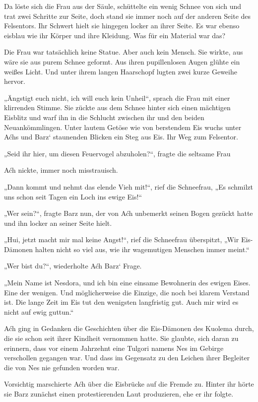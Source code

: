 Da löste sich die Frau aus der Säule, schüttelte ein wenig Schnee von sich und trat zwei Schritte zur Seite, doch stand sie immer noch auf der anderen Seite des Felsentors. Ihr Schwert hielt sie hingegen locker an ihrer Seite. Es war ebenso eisblau wie ihr Körper und ihre Kleidung. Was für ein Material war das?

Die Frau war tatsächlich keine Statue. Aber auch kein Mensch. Sie wirkte, aus wäre sie aus purem Schnee geformt. Aus ihren pupillenlosen Augen glühte ein weißes Licht. Und unter ihrem langen Haarschopf lugten zwei kurze Geweihe hervor.

„Ängstigt euch nicht, ich will euch kein Unheil“, sprach die Frau mit einer klirrenden Stimme. Sie zückte aus dem Schnee hinter sich einen mächtigen Eisblitz und warf ihn in die Schlucht zwischen ihr und den beiden Neuankömmlingen. Unter lautem Getöse wie von berstendem Eis wuchs unter Aćhs und Barz‘ staunenden Blicken ein Steg aus Eis. Ihr Weg zum Felsentor.

„Seid ihr hier, um diesen Feuervogel abzuholen?“, fragte die seltsame Frau

Aćh nickte, immer noch misstrauisch.

„Dann kommt und nehmt das elende Vieh mit!“, rief die Schneefrau, „Es schmilzt uns schon seit Tagen ein Loch ins ewige Eis!“

„Wer sein?“, fragte Barz nun, der von Aćh unbemerkt seinen Bogen gezückt hatte und ihn locker an seiner Seite hielt.

„Hui, jetzt macht mir mal keine Angst!“, rief die Schneefrau überspitzt, „Wir Eis-Dämonen halten nicht so viel aus, wie ihr wagemutigen Menschen immer meint.“

„Wer bist du?“, wiederholte Aćh Barz‘ Frage.

„Mein Name ist Nesdora, und ich bin eine einsame Bewohnerin des ewigen Eises. Eine der wenigen. Und möglicherweise die Einzige, die noch bei klarem Verstand ist. Die lange Zeit im Eis tut den wenigsten langfristig gut. Auch mir wird es nicht auf ewig guttun.“

Aćh ging in Gedanken die Geschichten über die Eis-Dämonen des Kuolema durch, die sie schon seit ihrer Kindheit vernommen hatte. Sie glaubte, sich daran zu erinnern, dass vor einem Jahrzehnt eine Tulgori namens Nes im Gebirge verschollen gegangen war. Und dass im Gegensatz zu den Leichen ihrer Begleiter die von Nes nie gefunden worden war.

Vorsichtig marschierte Aćh über die Eisbrücke auf die Fremde zu. Hinter ihr hörte sie Barz zunächst einen protestierenden Laut produzieren, ehe er ihr folgte.

